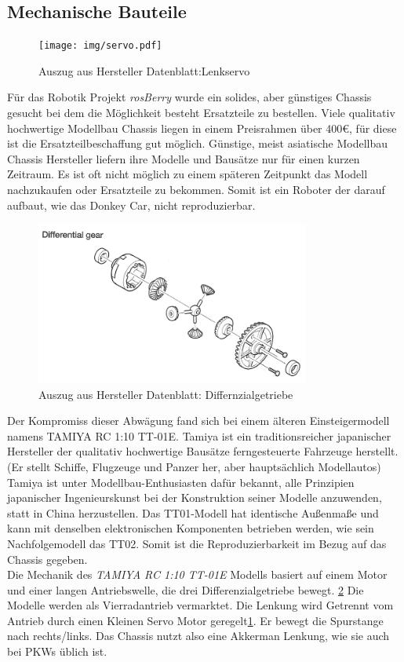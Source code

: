 \documentclass[conference]{IEEEtran}
\begin{document}
	\subsection{Mechanische Bauteile}
	
	\begin{figure} [!h]
		\centering
		\texttt{[image: img/servo.pdf]}
		\caption{Auszug aus Hersteller Datenblatt:Lenkservo }
		\label{Servomotor}
	\end{figure}
	Für das Robotik Projekt \textit{rosBerry} wurde ein solides, aber günstiges Chassis gesucht bei dem die Möglichkeit besteht Ersatzteile zu bestellen. Viele qualitativ hochwertige Modellbau Chassis liegen in einem Preisrahmen über 400€, für diese ist die Ersatzteilbeschaffung gut möglich. Günstige, meist asiatische Modellbau Chassis Hersteller liefern ihre Modelle und Bausätze nur für einen kurzen Zeitraum. Es ist oft nicht möglich zu einem späteren Zeitpunkt das Modell nachzukaufen oder Ersatzteile zu bekommen. Somit ist ein Roboter der darauf aufbaut, wie das Donkey Car, nicht reproduzierbar. 
	\\
	\begin{figure} %
		\centering
		\includegraphics[width=9cm]{img/geer.png}
		\caption{Auszug aus Hersteller Datenblatt: Differnzialgetriebe }
		\label{Getriebe}
	\end{figure}
	Der Kompromiss dieser Abwägung fand sich bei einem älteren 
	Einsteigermodell namens TAMIYA RC 1:10 TT-01E. Tamiya ist ein 
	traditionsreicher japanischer Hersteller der qualitativ hochwertige 
	Bausätze ferngesteuerte Fahrzeuge herstellt. (Er stellt Schiffe, Flugzeuge 
	und Panzer her, aber hauptsächlich Modellautos) Tamiya ist unter 
	Modellbau-Enthusiasten dafür bekannt, alle Prinzipien japanischer 
	Ingenieurskunst bei der Konstruktion seiner Modelle anzuwenden, statt 
	 in China herzustellen. Das TT01-Modell hat 
	identische Außenmaße und kann mit denselben elektronischen Komponenten 
	betrieben werden, wie sein Nachfolgemodell das TT02. Somit ist die 
	Reproduzierbarkeit im Bezug auf das Chassis gegeben.
	\\
	Die Mechanik des \textit{TAMIYA RC 1:10 TT-01E } Modells basiert auf 
	einem Motor und einer langen Antriebswelle, die drei Differenzialgetriebe 
	bewegt. \ref{Getriebe} Die Modelle werden als Vierradantrieb vermarktet. 
	Die Lenkung wird Getrennt vom Antrieb durch einen Kleinen Servo Motor 
	geregelt\ref{Servomotor}. Er bewegt die Spurstange nach rechts/links. Das 
	Chassis nutzt also eine Akkerman Lenkung, wie sie auch bei PKWs üblich ist.
	
\end{document}
